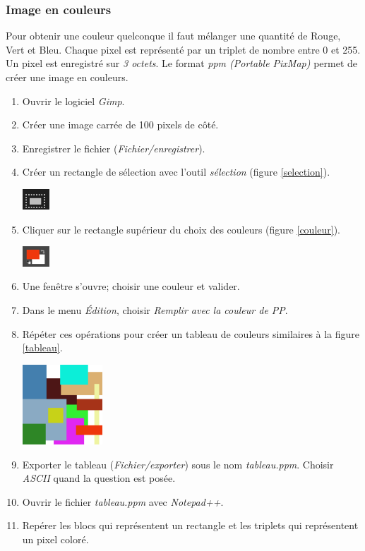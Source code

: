 \documentclass[a4paper,11pt]{article}
\begin{document}
\begin{Form}
\subsubsection{Image en couleurs}
Pour obtenir une couleur quelconque il faut mélanger une quantité de Rouge, Vert et Bleu. Chaque pixel est représenté par un triplet de nombre entre 0 et 255. Un pixel est enregistré sur \emph{3 octets}. Le format \emph{ppm (Portable PixMap)} permet de créer une image en couleurs.
\begin{activite}
\begin{enumerate}
\item Ouvrir le logiciel \emph{Gimp}.
\item Créer une image carrée de 100 pixels de côté.
\item Enregistrer le fichier (\emph{Fichier/enregistrer}).
\item Créer un rectangle de sélection avec l'outil \emph{sélection} (figure \ref{selection}).
\begin{center}
\centering
\includegraphics[width=1cm]{ressources/selection.png}
\label{selection}
\end{center}
\item Cliquer sur le rectangle supérieur du choix des couleurs (figure \ref{couleur}).
\begin{center}
\centering
\includegraphics[width=1cm]{ressources/couleur.png}
\label{couleur}
\end{center}
\item Une fenêtre s'ouvre; choisir une couleur et valider.
\item Dans le menu \emph{Édition}, choisir \emph{Remplir avec la couleur de PP}.
\item Répéter ces opérations pour créer un tableau de couleurs similaires à la figure \ref{tableau}.
\begin{center}
\centering
\includegraphics[width=3cm]{ressources/couleurs.png}
\label{tableau}
\end{center}
\item Exporter le tableau (\emph{Fichier/exporter}) sous le nom \emph{tableau.ppm}. Choisir \emph{ASCII} quand la question est posée.
\item Ouvrir le fichier \emph{tableau.ppm} avec \emph{Notepad++}.
\item Repérer les blocs qui représentent un rectangle et les triplets qui représentent un pixel coloré.
\end{enumerate}
\end{activite}

\end{Form}
\end{document}
